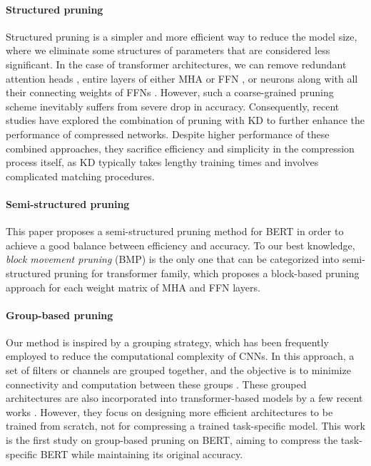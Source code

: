 \paragraph{Structured pruning} 
Structured pruning is a simpler and more efficient way to reduce the model size, where we eliminate some structures of parameters that are considered less significant. In the case of transformer architectures, we can remove redundant attention heads \cite{sixteen,voita,SMP}, entire layers of either MHA or FFN \cite{layer1,layer2}, or neurons along with all their connecting weights of FFNs \cite{earlybert}. However, such a coarse-grained pruning scheme inevitably suffers from severe drop in accuracy. Consequently, recent studies \cite{DynaBERT,block,Xia} have explored the combination of pruning with KD to further enhance the performance of compressed networks. Despite higher performance of these combined approaches, they sacrifice efficiency and simplicity in the compression process itself, as KD typically takes lengthy training times and involves complicated matching procedures.

\paragraph{Semi-structured pruning} This paper proposes a semi-structured pruning method for BERT in order to achieve a good balance between efficiency and accuracy. To our best knowledge, \textit{block movement pruning} (BMP) \cite{block} is the only one that can be categorized into semi-structured pruning for transformer family, which proposes a block-based pruning approach for each weight matrix of MHA and FFN layers. 

\paragraph{Group-based pruning} 
Our method is inspired by a grouping strategy, which has been frequently employed to reduce the computational complexity of CNNs. In this approach, a set of filters or channels are grouped together, and the objective is to minimize connectivity and computation between these groups \cite{DGC,Zhao,deeproot,xie,shufflenet}. These grouped architectures are also incorporated into transformer-based models by a few recent works \cite{GroupFormer,groupbert}. However, they focus on designing more efficient architectures to be trained from scratch, not for compressing a trained task-specific model. This work is the first study on group-based pruning on BERT, aiming to compress the task-specific BERT while maintaining its original accuracy.

